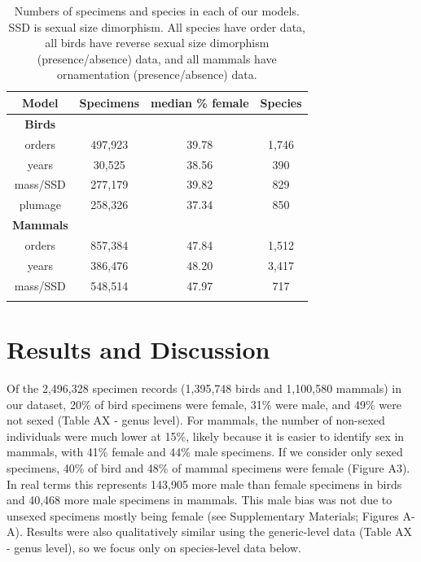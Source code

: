 \documentclass[a4paper, 12pt]{article}
\begin{document}
\begin{table}
\begin{tabular}{cccc}

\caption{Numbers of specimens and species in each of our models. SSD is sexual size dimorphism. All species have order data, all birds have reverse sexual size dimorphism (presence/absence) data, and all mammals have ornamentation (presence/absence) data.} 
  
  \hline
  \textbf{Model} & \textbf{Specimens} & \textbf{median \% female} & \textbf{Species}\\ 
  \hline
  \textbf{Birds} & & &\\
  \hline
  orders & 497,923 & 39.78 & 1,746\\
  years & 30,525 & 38.56 & 390\\
  mass/SSD & 277,179 & 39.82 & 829\\
  plumage & 258,326 & 37.34 & 850\\
  \hline
  \textbf{Mammals} &&&\\
  \hline
  orders & 857,384 & 47.84 & 1,512\\
  years & 386,476 & 48.20 & 3,417\\
  mass/SSD & 548,514 & 47.97 & 717\\
  \hline

\label{table_numbers}
\end{tabular}
\end{table}


\section{Results and Discussion}

Of the 2,496,328 specimen records (1,395,748 birds and 1,100,580 mammals) in our dataset, 20\% of bird specimens were female, 31\% were male, and 49\% were not sexed (Table AX - genus level). 
For mammals, the number of non-sexed individuals were much lower at 15\%, likely because it is easier to identify sex in mammals, with 41\% female and 44\% male specimens. 
If we consider only sexed specimens, 40\% of bird and 48\% of mammal specimens were female (Figure A3). 
In real terms this represents 143,905 more male than female specimens in birds and 40,468 more male specimens in mammals. 
This male bias was not due to unsexed specimens mostly being female (see Supplementary Materials; Figures A-A).
Results were also qualitatively similar using the generic-level data (Table AX - genus level), so we focus only on species-level data below.
\end{document}
